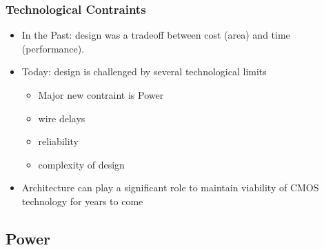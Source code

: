 \documentclass{beamer}
\begin{document}
\begin{frame}[fragile,t]
\frametitle{Technological Contraints}

\begin{itemize}
    \item In the Past: design was a tradeoff 
            between cost (area) and time (performance).\bigskip
    \item Today: design is challenged by several technological limits\smallskip
        \begin{itemize} 
            \item Major new contraint is Power\smallskip
            \item wire delays\smallskip
            \item reliability\smallskip
            \item complexity of design
        \end  {itemize}\bigskip

    \item Architecture can play a significant role to maintain viability
            of CMOS technology for years to come
\end{itemize}
\end{frame}

\subsection{Power}
\end{document}
